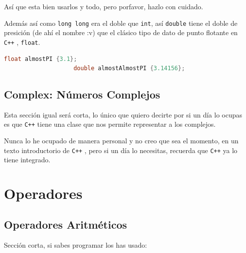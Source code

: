 \documentclass[12pt, fleqn]{report}                             %
\theoremstyle{break}                                            %
\newcommand \Cpp  {\texttt{C++} }                               %
\begin{document}
                Así que esta bien usarlos y todo, pero porfavor, hazlo con cuidado.

                Además así como \texttt{long long} era el doble que \texttt{int}, así
                \texttt{double} tiene el doble de presición (de ahí el nombre :v) que el clásico
                tipo de dato de punto flotante en \Cpp, \texttt{float}.

                \begin{lstlisting}[language=C++, gobble=20]
                    float almostPI {3.1};
                    double almostAlmostPI {3.14156};
                \end{lstlisting}
                

            \subsection{Complex: Números Complejos}

                Esta sección igual será corta, lo único que quiero decirte por si un día lo ocupas
                es que \Cpp tiene una clase que nos permite representar a los complejos.

                Nunca lo he ocupado de manera personal y no creo que sea el momento, en un texto introductorio
                de \Cpp, pero si un día lo necesitas, recuerda que \Cpp ya lo tiene integrado.

            
        \clearpage
        \section{Operadores}

            \subsection{Operadores Aritméticos}

                Sección corta, si sabes programar los has usado:
\end{document}
